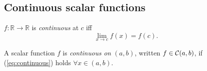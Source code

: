 

\subsection{Continuous scalar functions}
\label{sec:cont-scal-funct}

\begin{defn}
  \label{def:continuousScalarFunc}
  $f: \mathbb{R}\rightarrow \mathbb{R}$
  is \emph{continuous} at $c$
  iff
   \begin{equation}
     \label{eq:continuous}
     \lim_{x\rightarrow c} f(x) = f(c).
   \end{equation}
\end{defn}

\begin{defn}
  \label{def:continuousFuncOnR}
  A scalar function $f$ is \emph{continuous on} $(a,b)$,
     written \mbox{$f\in{\cal C}(a,b)$}, 
     if (\ref{eq:continuous}) holds  $\forall x\in (a,b)$.
\end{defn}


